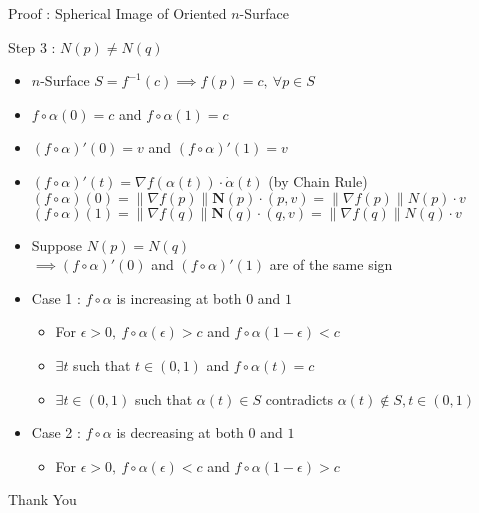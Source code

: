 \documentclass{beamer}
\begin{document}
\begin{frame}{Proof : Spherical Image of Oriented $n$-Surface}
\begin{block}{Step 3 : $N(p) \ne N(q)$}
\begin{itemize}
	\item $n$-Surface $S = f^{-1}(c) \implies f(p) = c,\ \forall p \in S$
	\item $f \circ \alpha (0) = c$ and $f \circ \alpha (1) = c$
	\item $(f \circ \alpha)'(0) = v$ and $(f \circ \alpha)'(1) = v$
	\item {\color{blue}$(f \circ \alpha)'(t) = \nabla f(\alpha(t)) \cdot \dot{\alpha}(t)$} (by Chain Rule)\\
	$(f \circ \alpha)(0) = \|\nabla f(p)\| \mathbf{N}(p) \cdot (p,v) = \| \nabla f(p) \| N(p) \cdot v$\\
	$(f \circ \alpha)(1) = \|\nabla f(q)\| \mathbf{N}(q) \cdot (q,v) = \| \nabla f(q) \| N(q) \cdot v$
\item Suppose $N(p) = N(q)$\\
	$\implies (f \circ \alpha)'(0)$ and $(f \circ \alpha)'(1) $ are of the same sign
	\item Case 1 : $f \circ \alpha$ is increasing at both $0$ and $1$
	\begin{itemize}
		\item For $\epsilon > 0,\ f \circ \alpha(\epsilon) > c$ and $f \circ \alpha (1-\epsilon) < c$
		\item $\exists t$ such that $t \in (0,1)$ and $f \circ \alpha(t) = c$
		\item $\exists t \in (0,1)$ such that $\alpha(t) \in S$ {\color{red} contradicts $\alpha(t) \notin S,t \in (0,1)$}
	\end{itemize}
	\item Case 2 : $f \circ \alpha$ is decreasing at both $0$ and $1$
	\begin{itemize}
		\item For $\epsilon > 0,\ f \circ \alpha(\epsilon) < c$ and $f \circ \alpha (1-\epsilon) > c$
	\end{itemize}
\end{itemize}
\end{block}
\end{frame}

\begin{frame}
	\vspace{0.6in}
	\hspace{3cm} {\color{blue}\Huge{Thank You}}
\end{frame}
\end{document}

